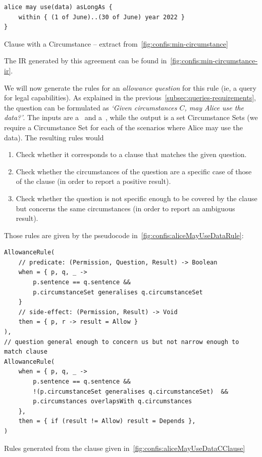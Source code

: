 \begin{listing}[h]
    \centering
    \begin{minipage}{0.7\textwidth}
        \begin{verbatim}
alice may use(data) asLongAs {
    within { (1 of June)..(30 of June) year 2022 }
}
        \end{verbatim}
    \end{minipage}
    \caption{Clause with a Circumstance -- extract from~\autoref{fig:confis:min-circumstance}}
    \label{fig:confis:aliceMayUseDataCClause}
\end{listing}

The IR generated by this agreement can be found in~\autoref{fig:confis:min-circumstance-ir}.

We will now generate the rules for an \emph{allowance question} for this rule (ie, a query for legal capabilities).
As explained in the previous~\autoref{subsec:queries-requirements}, the question can be formulated as \emph{`Given circumstances $C$, may Alice use the data?'}.
The inputs are a~ and a~, while the output is a set Circumstance Sets (we require a Circumstance Set for each of the scenarios where Alice may use the data).
The resulting rules would
\begin{enumerate}
    \item Check whether it corresponds to a clause that matches the given question.
    \item Check whether the circumstances of the question are a specific case of those of the clause (in order to report a positive result).
    \item Check whether the question is not specific enough to be covered by the clause but concerns the same circumstances (in order to report an ambiguous result).
\end{enumerate}

Those rules are given by the pseudocode in~\autoref{fig:confis:aliceMayUseDataRule}:

\begin{listing}[h]
    \centering
    \begin{verbatim}
AllowanceRule(
    // predicate: (Permission, Question, Result) -> Boolean
    when = { p, q, _ ->
        p.sentence == q.sentence &&
        p.circumstanceSet generalises q.circumstanceSet
    }
    // side-effect: (Permission, Result) -> Void
    then = { p, r -> result = Allow }
),
// question general enough to concern us but not narrow enough to match clause
AllowanceRule(
    when = { p, q, _ ->
        p.sentence == q.sentence &&
        !(p.circumstanceSet generalises q.circumstanceSet)  &&
        p.circumstances overlapsWith q.circumstances
    },
    then = { if (result != Allow) result = Depends },
)
    \end{verbatim}
    \caption{Rules generated from the clause given in~\autoref{fig:confis:aliceMayUseDataCClause}}
    \label{fig:confis:aliceMayUseDataRule}
\end{listing}

